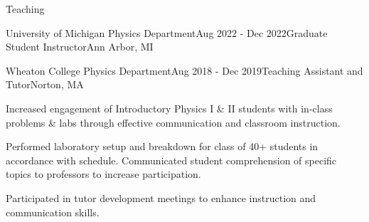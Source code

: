 \documentclass{resume} %
\begin{document}
\begin{rSection}{Teaching}
\begin{rSubsection}{University of Michigan Physics Department}{Aug 2022 - Dec 2022}{Graduate Student Instructor}{Ann Arbor, MI}
\end{rSubsection}
\begin{rSubsection}{Wheaton College Physics Department}{Aug 2018 - Dec 2019}{Teaching Assistant and Tutor}{Norton, MA}
    \item Increased engagement of Introductory Physics I \& II students with in-class problems \& labs through effective communication and classroom instruction.
    \item Performed laboratory setup and breakdown for class of 40+ students in accordance with schedule. Communicated student comprehension of specific topics to professors to increase participation.
    
    \item Participated in tutor development meetings to enhance instruction and communication skills.

\end{rSubsection}

\end{rSection}
\end{document}
